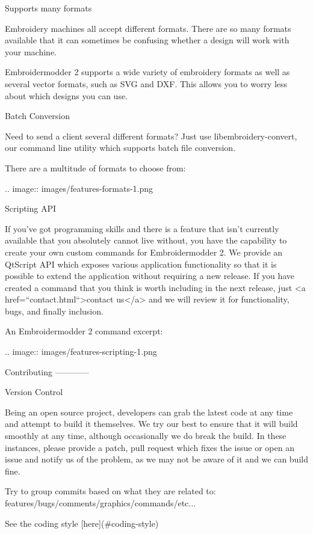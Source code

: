 \documentclass[a4paper]{report}
\begin{document}
{Supports many formats
~~~~~~~~~~~~~~~~~~~~~

Embroidery machines all accept different formats. There are so many formats available that it can sometimes be confusing whether a design will work with your machine.

Embroidermodder 2 supports a wide variety of embroidery formats as well as several vector formats, such as SVG and DXF. This allows you to worry less about which designs you can use.

Batch Conversion
~~~~~~~~~~~~~~~~

Need to send a client several different formats? Just use libembroidery-convert, our command line utility which supports batch file conversion.

There are a multitude of formats to choose from:

.. image::
   images/features-formats-1.png

Scripting API
~~~~~~~~~~~~~

If you've got programming skills and there is a feature that isn't currently available that you absolutely cannot live without, you have the capability to create your own custom commands for Embroidermodder 2. We provide an QtScript API which exposes various application functionality so that it is possible to extend the application without requiring a new release. If you have created a command that you think is worth including in the next release, just <a href=``contact.html``>contact us</a> and we will review it for functionality, bugs, and finally inclusion.

An Embroidermodder 2 command excerpt:

.. image::
   images/features-scripting-1.png

Contributing
------------

Version Control
~~~~~~~~~~~~~~~

Being an open source project, developers can grab the latest code at any time
and attempt to build it themselves. We try our best to ensure that it will build smoothly
at any time, although occasionally we do break the build. In these instances,
please provide a patch, pull request which fixes the issue or open an issue and
notify us of the problem, as we may not be aware of it and we can build fine.

Try to group commits based on what they are related to: features/bugs/comments/graphics/commands/etc...

See the coding style [here](#coding-style)

}
\end{document}
